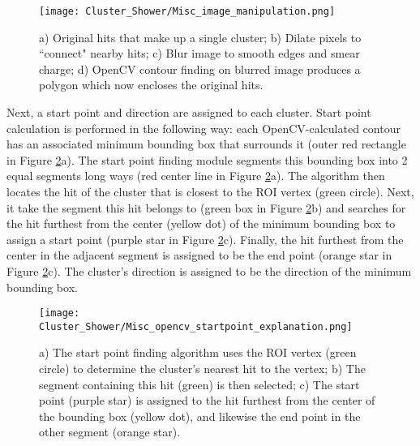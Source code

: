 \begin{figure}[H]
\centering
\texttt{[image: Cluster\_Shower/Misc\_image\_manipulation.png]}
\caption{ a) Original hits that make up a single cluster; b) Dilate pixels to ``connect" nearby hits; c) Blur image to smooth edges and smear charge; d) OpenCV contour finding on blurred image produces a polygon which now encloses the original hits.}
\label{fig:sbc}
\end{figure}



\par Next, a start point and direction are assigned to each cluster. Start point calculation is performed in the following way: each OpenCV-calculated contour has an associated minimum bounding box \cite{bib:minAreaRect} that surrounds it (outer red rectangle in Figure \ref{fig:misc_opencv_startpoint}a). The start point finding module segments this bounding box into 2 equal segments long ways (red center line in Figure \ref{fig:misc_opencv_startpoint}a). The algorithm then locates the hit of the cluster that is closest to the ROI vertex (green circle).  Next, it take the segment this hit belongs to (green box in Figure \ref{fig:misc_opencv_startpoint}b) and searches for the hit furthest from the center (yellow dot) of the minimum bounding box to assign a start point (purple star in Figure \ref{fig:misc_opencv_startpoint}c). Finally, the hit furthest from the center in the adjacent segment is assigned to be the end point (orange star in Figure \ref{fig:misc_opencv_startpoint}c). The cluster's direction is assigned to be the direction of the minimum bounding box.

\begin{figure}[h!]
\centering
\texttt{[image: Cluster\_Shower/Misc\_opencv\_startpoint\_explanation.png]}
\caption{ a) The start point finding algorithm uses the ROI vertex (green circle) to determine the
cluster’s nearest hit to the vertex; b) The segment containing this hit (green) is then selected; c) The
start point (purple star) is assigned to the hit furthest from the center of the bounding box (yellow
dot), and likewise the end point in the other segment (orange star). }
\label{fig:misc_opencv_startpoint}
\end{figure}

